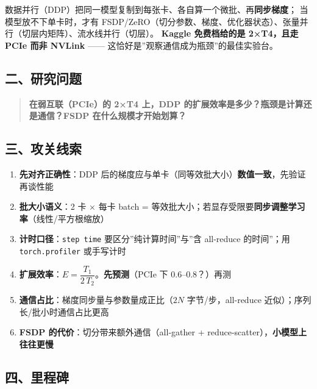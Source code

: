 \documentclass[
  chinese,
  11pt,
]{ctexart}
\providecommand{\tightlist}{%
  \setlength{\itemsep}{0pt}\setlength{\parskip}{0pt}}
\begin{document}
数据并行（DDP）把同一模型复制到每张卡、各自算一个微批、再\textbf{同步梯度}； 当模型放不下单卡时，才有 FSDP/ZeRO（切分参数、梯度、优化器状态）、张量并行（切层内矩阵）、流水线并行（切层）。 \textbf{Kaggle 免费档给的是 2×T4，且走 PCIe 而非 NVLink} ------ 这恰好是''观察通信成为瓶颈''的最佳实验台。

\subsection{二、研究问题}\label{ux4e8cux7814ux7a76ux95eeux9898}

\begin{quote}
\textbf{在弱互联（PCIe）的 2×T4 上，DDP 的扩展效率是多少？瓶颈是计算还是通信？FSDP 在什么规模才开始划算？}
\end{quote}

\subsection{三、攻关线索}\label{ux4e09ux653bux5173ux7ebfux7d22-4}

\begin{enumerate}
\def\labelenumi{\arabic{enumi}.}
\tightlist
\item
  \textbf{先对齐正确性}：DDP 后的梯度应与单卡（同等效批大小）\textbf{数值一致}，先验证再谈性能
\item
  \textbf{批大小语义}：2 卡 × 每卡 batch = 等效批大小；若显存受限要\textbf{同步调整学习率}（线性/平方根缩放）
\item
  \textbf{计时口径}：\texttt{step\ time} 要区分''纯计算时间''与''含 all-reduce 的时间''；用 \texttt{torch.profiler} 或手写计时
\item
  \textbf{扩展效率}：\(E = \dfrac{T_1}{2\,T_2}\)。\textbf{先预测}（PCIe 下 0.6--0.8？）再测
\item
  \textbf{通信占比}：梯度同步量与参数量成正比（\(2N\) 字节/步，all-reduce 近似）；序列长/批小时通信占比更高
\item
  \textbf{FSDP 的代价}：切分带来额外通信（all-gather + reduce-scatter），\textbf{小模型上往往更慢}
\end{enumerate}

\subsection{四、里程碑}\label{ux56dbux91ccux7a0bux7891-4}
\end{document}
